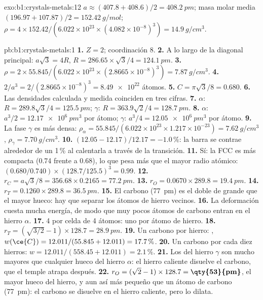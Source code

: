 \begin{solution}{exo:b1:crystals-metals:12}
$a \approx (407.8 + 408.6)/2 = \qty{408.2}{pm}$; masa molar media $(196.97 +
107.87)/2 = \qty{152.42}{g/mol}$; $\rho = 4 \times 152.42/(6.022 \times
10^{23} \times (4.082 \times 10^{-8})^3) = \qty{14.9}{g/cm^3}$.
\end{solution}

\begin{solution}{pb:b1:crystals-metals:1}
\textbf{1.} $Z = 2$; coordinación 8.
\textbf{2.} A lo largo de la diagonal principal: $a\sqrt3 = 4R$, $R = 286.65 \times
\sqrt3/4 = \qty{124.1}{pm}$.
\textbf{3.} $\rho = 2 \times 55.845/(6.022 \times 10^{23} \times (2.8665
\times 10^{-8})^3) = \qty{7.87}{g/cm^3}$.
\textbf{4.} $2/a^3 = 2/(2.8665 \times 10^{-8})^3 = \num{8.49e22}$ átomos.
\textbf{5.} $C = \pi\sqrt3/8 = 0.680$.
\textbf{6.} Las densidades calculada y medida coinciden en tres cifras.
\textbf{7.} $\alpha$: $R = 289.8\sqrt3/4 = \qty{125.5}{pm}$; $\gamma$:
$R = 363.9\sqrt2/4 = \qty{128.7}{pm}$.
\textbf{8.} $\alpha$: $a^3/2 = \qty{12.17e6}{pm^3}$ por átomo; $\gamma$:
$a^3/4 = \qty{12.05e6}{pm^3}$ por átomo.
\textbf{9.} La fase $\gamma$ es más densa: $\rho_\alpha = 55.845/(6.022 \times 10^{23}
\times 1.217 \times 10^{-23}) = \qty{7.62}{g/cm^3}$, $\rho_\gamma =
\qty{7.70}{g/cm^3}$.
\textbf{10.} $(12.05 - 12.17)/12.17 = -1.0\,\%$: la barra se contrae
alrededor de un 1\,\% al calentarla a través de la transición.
\textbf{11.} Sí: la FCC es más compacta (0.74 frente a 0.68), lo que pesa
más que el mayor radio atómico: $(0.680/0.740) \times (128.7/125.5)^3 = 0.99$.
\textbf{12.} $r_C = a\sqrt3/8 = 356.68 \times 0.2165 = \qty{77.2}{pm}$.
\textbf{13.} $r_O = 0.0670 \times 289.8 = \qty{19.4}{pm}$.
\textbf{14.} $r_T = 0.1260 \times 289.8 = \qty{36.5}{pm}$.
\textbf{15.} El carbono (\qty{77}{pm}) es el doble de grande que el mayor
hueco: hay que separar los átomos de hierro vecinos.
\textbf{16.} La deformación cuesta mucha energía, de modo que muy pocos
átomos de carbono entran en el hierro $\alpha$.
\textbf{17.} 4  por celda de 4 átomos: uno por átomo de
hierro.
\textbf{18.} $r_T = (\sqrt{3/2} - 1) \times 128.7 = \qty{28.9}{pm}$.
\textbf{19.} Un carbono por hierro: , $w(\ce{C}) = 12.011/(55.845 +
12.011) = 17.7\,\%$.
\textbf{20.} Un carbono por cada diez hierros: $w = 12.011/(558.45 + 12.011) =
2.1\,\%$.
\textbf{21.} Los  del hierro $\gamma$ son mucho mayores
que cualquier hueco del hierro $\alpha$: el hierro caliente disuelve el
carbono, que el temple atrapa después.
\textbf{22.} $r_O = (\sqrt2 - 1) \times 128.7 = \textbf{\qty{53}{pm}}$, el
mayor hueco del hierro, y aun así más pequeño que un átomo de carbono
(\qty{77}{pm}): el carbono se disuelve en el hierro caliente, pero lo
dilata.
\end{solution}
